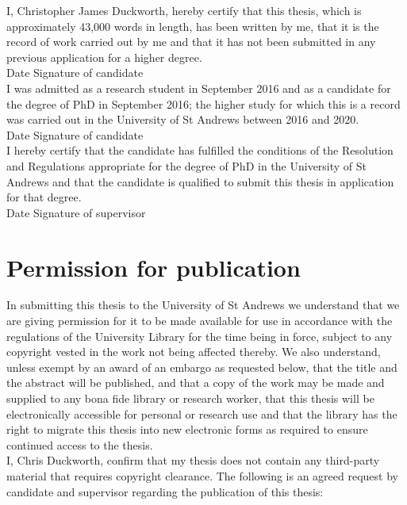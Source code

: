 \documentclass[11pt]{book}
\begin{document}
I, Christopher James Duckworth, hereby certify that this thesis, which is approximately 43,000 words in length, has been written by me, that it is the record of work carried out by me and that it has not been submitted in any previous application for a higher degree.\\

Date  \hspace{1.8in} Signature of candidate \\

I was admitted as a research student in September 2016 and as a candidate for the degree of PhD in September 2016; the higher study for which this is a record was carried out in the University of St Andrews between 2016 and 2020.\\

Date  \hspace{1.8in} Signature of candidate \\

I hereby certify that the candidate has fulfilled the conditions of the Resolution and Regulations appropriate for the degree of PhD in the University of St Andrews and that the candidate is qualified to submit this thesis in application for that degree.\\

Date  \hspace{1.8in} Signature of supervisor \\

\chapter{Permission for publication}
In submitting this thesis to the University of St Andrews we understand that we are giving permission for it to be made available for use in accordance with the regulations of the University Library for the time being in force, subject to any copyright vested in the work not being affected thereby. We also understand, unless exempt by an award of an embargo as requested below, that the title and the abstract will be published, and that a copy of the work may be made and supplied to any bona fide library or research worker, that this thesis will be electronically accessible for personal or research use and that the library has the right to migrate this thesis into new electronic forms as required to ensure continued access to the thesis.\\

I, Chris Duckworth, confirm that my thesis does not contain any third-party material that requires copyright clearance.
The following is an agreed request by candidate and supervisor regarding the publication of this thesis:\\
\end{document}
